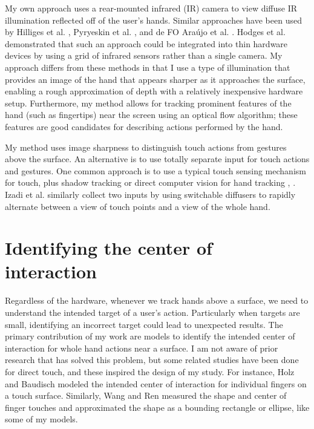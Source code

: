 My own approach uses a rear-mounted infrared (IR) camera to view diffuse IR illumination reflected off of the user's hands. 
Similar approaches have been used by Hilliges et al. \cite{Hilliges:2009:IAAFDIT}, Pyryeskin et al. \cite{Pyryeskin:2011:EIIHSURL}, and de FO Ara{\'u}jo et al. \cite{De:2009:DHFBMTDA}. Hodges et al. \cite{Hodges:2007:Thinsight} demonstrated that such an approach could be integrated into thin hardware devices by using a grid of infrared sensors rather than a single camera.
My approach differs from these methods in that I use a type of illumination that provides an image of the hand that appears sharper as it approaches the surface, enabling a rough approximation of depth with a relatively inexpensive hardware setup. 
Furthermore, my method allows for tracking prominent features of the hand (such as fingertips) near the screen using an optical flow algorithm; these features are good candidates for describing actions performed by the hand.

My method uses image sharpness to distinguish touch actions from gestures above the surface. 
An alternative is to use totally separate input for touch actions and gestures. 
One common approach is to use a typical touch sensing mechanism for touch, plus shadow tracking or direct computer vision for hand tracking \cite{Dohse:2008:EMUIMTDUHT}, \cite{Brandl:2007:ARPSUDPHG}. 
Izadi et al. \cite{Izadi:2008:GBDSTESD} similarly collect two inputs by using switchable diffusers to rapidly alternate between a view of touch points and a view of the whole hand. 

\section{Identifying the center of interaction}
Regardless of the hardware, whenever we track hands above a surface, we need to understand the intended target of a user's action. 
Particularly when targets are small, identifying an incorrect target could lead to unexpected results. 
The primary contribution of my work are models to identify the intended center of interaction for whole hand actions near a surface. 
I am not aware of prior research that has solved this problem, but some related studies have been done for direct touch, and these inspired the design of my study. 
For instance, Holz and Baudisch  \cite{Holz:2011:UT} modeled the intended center of interaction for individual fingers on a touch surface. 
Similarly, Wang and Ren \cite{Wang:2009:EEFIMI} measured the shape and center of
finger touches and approximated the shape as a bounding rectangle or ellipse,
like some of my models.


